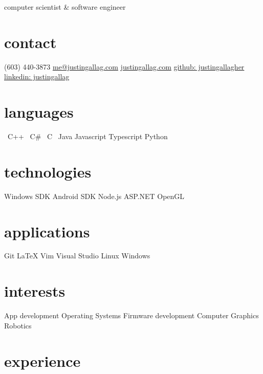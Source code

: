 \documentclass[print]{template/friggeri-cv}
\newcommand{\starr}{\raisebox{0.2ex}{$\star $}}
\begin{document}
    {computer scientist \& software engineer}

    \begin{aside}
        \section{contact}
            (603) 440-3873
            \href{mailto:me@justingallag.com}{me@justingallag.com}
            \href{http://justingallag.com}{justingallag.com}
            \href{https://github.com/justingallagher}{github: justingallagher}
            \href{https://www.linkedin.com/in/justingallag}{linkedin: justingallag} \vspace{\parsep}
        \section{languages}
            \starr \ C++
            \starr \ C\#
            \starr \ C
            \starr \ Java
            Javascript
            Typescript
            Python \vspace{\parsep}
        \section{technologies}
            Windows SDK
            Android SDK
            Node.js
            ASP.NET
            OpenGL \vspace{\parsep}
        \section{applications}
            Git
            LaTeX
            Vim
            Visual Studio
            Linux
            Windows \vspace{\parsep}
        \section{interests}
            App development
            Operating Systems
            Firmware development
            Computer Graphics
            Robotics
    \end{aside}

    \section{experience}
\end{document}
